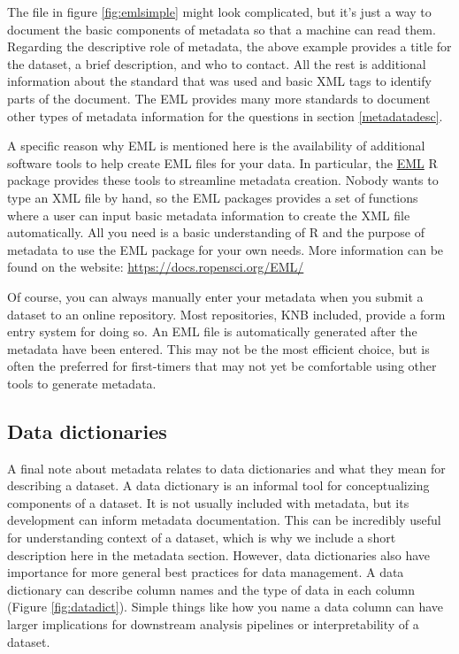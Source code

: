 \documentclass[
]{book}
\begin{document}
The file in figure \ref{fig:emlsimple} might look complicated, but it's just a way to document the basic components of metadata so that a machine can read them. Regarding the descriptive role of metadata, the above example provides a title for the dataset, a brief description, and who to contact. All the rest is additional information about the standard that was used and basic XML tags to identify parts of the document. The EML provides many more standards to document other types of metadata information for the questions in section \ref{metadatadesc}.

A specific reason why EML is mentioned here is the availability of additional software tools to help create EML files for your data. In particular, the \href{https://docs.ropensci.org/EML/}{EML} R package provides these tools to streamline metadata creation. Nobody wants to type an XML file by hand, so the EML packages provides a set of functions where a user can input basic metadata information to create the XML file automatically. All you need is a basic understanding of R and the purpose of metadata to use the EML package for your own needs. More information can be found on the website: \url{https://docs.ropensci.org/EML/}

Of course, you can always manually enter your metadata when you submit a dataset to an online repository. Most repositories, KNB included, provide a form entry system for doing so. An EML file is automatically generated after the metadata have been entered. This may not be the most efficient choice, but is often the preferred for first-timers that may not yet be comfortable using other tools to generate metadata.

\hypertarget{dict}{%
\subsection{Data dictionaries}\label{dict}}

A final note about metadata relates to data dictionaries and what they mean for describing a dataset. A data dictionary is an informal tool for conceptualizing components of a dataset. It is not usually included with metadata, but its development can inform metadata documentation. This can be incredibly useful for understanding context of a dataset, which is why we include a short description here in the metadata section. However, data dictionaries also have importance for more general best practices for data management. A data dictionary can describe column names and the type of data in each column (Figure \ref{fig:datadict}). Simple things like how you name a data column can have larger implications for downstream analysis pipelines or interpretability of a dataset.
\end{document}
